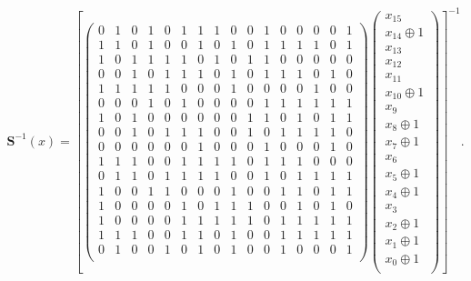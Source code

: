 \begin{equation*}
\renewcommand{\arraystretch}{0.7} %
\mathbf{S}^{-1}(x) = 
\left[
\begin{pmatrix}
0 & 1 & 0 & 1 & 0 & 1 & 1 & 1 & 0 & 0 & 1 & 0 & 0 & 0 & 0 & 1 \\
1 & 1 & 0 & 1 & 0 & 0 & 1 & 0 & 1 & 0 & 1 & 1 & 1 & 1 & 0 & 1 \\
1 & 0 & 1 & 1 & 1 & 1 & 0 & 1 & 0 & 1 & 1 & 0 & 0 & 0 & 0 & 0 \\
0 & 0 & 1 & 0 & 1 & 1 & 1 & 0 & 1 & 0 & 1 & 1 & 1 & 0 & 1 & 0 \\

1 & 1 & 1 & 1 & 1 & 0 & 0 & 0 & 1 & 0 & 0 & 0 & 0 & 1 & 0 & 0 \\
0 & 0 & 0 & 1 & 0 & 1 & 0 & 0 & 0 & 0 & 1 & 1 & 1 & 1 & 1 & 1 \\
1 & 0 & 1 & 0 & 0 & 0 & 0 & 0 & 0 & 1 & 1 & 0 & 1 & 0 & 1 & 1 \\
0 & 0 & 1 & 0 & 1 & 1 & 1 & 0 & 0 & 1 & 0 & 1 & 1 & 1 & 1 & 0 \\

0 & 0 & 0 & 0 & 0 & 0 & 1 & 0 & 0 & 0 & 1 & 0 & 0 & 0 & 1 & 0 \\
1 & 1 & 1 & 0 & 0 & 1 & 1 & 1 & 1 & 0 & 1 & 1 & 1 & 0 & 0 & 0 \\
0 & 1 & 1 & 0 & 1 & 1 & 1 & 1 & 0 & 0 & 1 & 0 & 1 & 1 & 1 & 1 \\
1 & 0 & 0 & 1 & 1 & 0 & 0 & 0 & 1 & 0 & 0 & 1 & 1 & 0 & 1 & 1 \\

1 & 0 & 0 & 0 & 0 & 1 & 0 & 1 & 1 & 1 & 0 & 0 & 1 & 0 & 1 & 0 \\
1 & 0 & 0 & 0 & 0 & 1 & 1 & 1 & 1 & 1 & 0 & 1 & 1 & 1 & 1 & 1 \\
1 & 1 & 1 & 0 & 0 & 1 & 1 & 0 & 1 & 0 & 0 & 1 & 1 & 1 & 1 & 1 \\
0 & 1 & 0 & 0 & 1 & 0 & 1 & 0 & 1 & 0 & 0 & 1 & 0 & 0 & 0 & 1 \\
\end{pmatrix}
\begin{pmatrix}
x_{15} \\
x_{14} \oplus 1 \\
x_{13} \\
x_{12} \\
x_{11} \\
x_{10} \oplus 1 \\
x_{9} \\
x_{8} \oplus 1 \\
x_{7} \oplus 1 \\
x_{6} \\
x_{5} \oplus 1 \\
x_{4} \oplus 1 \\
x_{3} \\
x_{2} \oplus 1 \\
x_{1} \oplus 1 \\
x_{0} \oplus 1 \\
\end{pmatrix}
\right]^{-1}.
\end{equation*}

